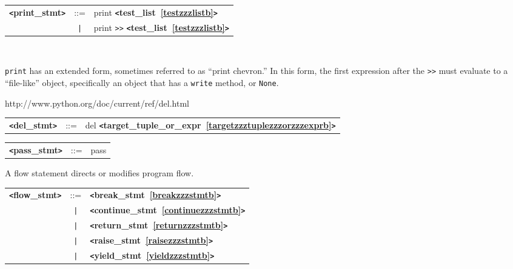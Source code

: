 \documentclass[12pt]{article}
\begin{document}
\label{printzzzstmtb}
\begin{tabular}{lcl}
{\bf \verb+<+print\_stmt\verb+>+} & ::=  & print {\bf \verb+<+test\_list~\ref{testzzzlistb}\verb+>+}  \\
 & \verb+|+  & print \verb|>>| {\bf \verb+<+test\_list~\ref{testzzzlistb}\verb+>+}  \\
\end{tabular} \\


\verb|print| has an extended form, sometimes referred to as ``print chevron.'' 
In this form, the first expression after the \verb+>>+ must evaluate to a ``file-like'' 
object, specifically an object that has a \verb|write| method, or \verb|None|.



\label{delzzzstmtb}
http://www.python.org/doc/current/ref/del.html

\begin{tabular}{lcl}
{\bf \verb+<+del\_stmt\verb+>+} & ::=  & del {\bf \verb+<+target\_tuple\_or\_expr~\ref{targetzzztuplezzzorzzzexprb}\verb+>+}  \\
\end{tabular}

\label{passzzzstmtb}
\begin{tabular}{lcl}
{\bf \verb+<+pass\_stmt\verb+>+} & ::=  & pass \\
\end{tabular}

\label{flowzzzstmtb}
A flow statement directs or modifies program flow. \\

\begin{tabular}{lcl}
{\bf \verb+<+flow\_stmt\verb+>+} & ::=  & {\bf \verb+<+break\_stmt~\ref{breakzzzstmtb}\verb+>+}  \\
 & \verb+|+  & {\bf \verb+<+continue\_stmt~\ref{continuezzzstmtb}\verb+>+}  \\
 & \verb+|+  & {\bf \verb+<+return\_stmt~\ref{returnzzzstmtb}\verb+>+}  \\
 & \verb+|+  & {\bf \verb+<+raise\_stmt~\ref{raisezzzstmtb}\verb+>+}  \\
 & \verb+|+  & {\bf \verb+<+yield\_stmt~\ref{yieldzzzstmtb}\verb+>+}  \\
\end{tabular}
\end{document}
